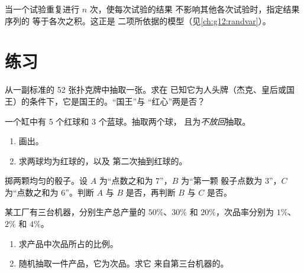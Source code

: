 \begin{definition}[独立重复试验]\label{def:g12:condprob:repet}
当一个试验重复进行 $n$ 次，使每次试验的结果
不影响其他各次试验时，指定结果序列的
等于各次之积。这正是
二项所依据的模型（见\cref{ch:g12:randvar}）。
\end{definition}

\section{练习}

\begin{exercise}[$\star$]\label{exo:g12:condprob:1}
从一副标准的 52 张扑克牌中抽取一张。求在
已知它为人头牌（杰克、皇后或国王）的条件下，它是国王的。“国王”与
“红心”两是否？
\end{exercise}

\begin{exercise}[$\star$]\label{exo:g12:condprob:2}
一个缸中有 5 个红球和 3 个蓝球。抽取两个球，
且为\emph{不放回}抽取。
\begin{enumerate}
  \item 画出。
  \item 求两球均为红球的，以及
        第二次抽到红球的。
\end{enumerate}
\end{exercise}

\begin{exercise}[$\star$]\label{exo:g12:condprob:3}
掷两颗均匀的骰子。设 $A$ 为“点数之和为 $7$”，$B$ 为“第一颗
骰子点数为 $3$”，$C$ 为“点数之和为 $6$”。判断 $A$ 与 $B$
是否，再判断 $B$ 与 $C$ 是否。
\end{exercise}

\begin{exercise}[$\star\star$]\label{exo:g12:condprob:4}
某工厂有三台机器，分别生产总产量的 $50\%$、$30\%$ 和
$20\%$，次品率分别为 $1\%$、$2\%$ 和 $4\%$。
\begin{enumerate}
  \item 求产品中次品所占的比例。
  \item 随机抽取一件产品，它为次品。求它
        来自第三台机器的。
\end{enumerate}
\end{exercise}


